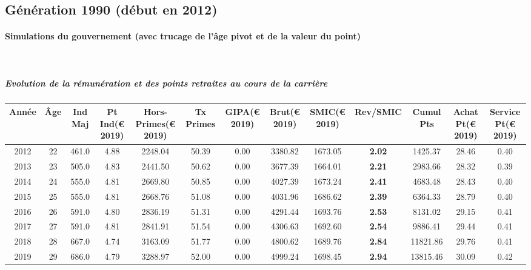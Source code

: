 \newpage 
 
\subsection{Génération 1990 (début en 2012)} 

\paragraph{Simulations du gouvernement (avec trucage de l'âge pivot et de la valeur du point)}  ~\\ 
 
\subparagraph{Evolution de la rémunération et des points retraites au cours de la carrière} 
 
{ \scriptsize \begin{center} 
\begin{tabular}[htb]{|c|c||c|c|c|c|c|c||c|c||c|c|c||} 
\hline 
 Année &  Âge &  Ind Maj &  Pt Ind(\euro{} 2019) &   Hors-Primes(\euro{} 2019) &  Tx Primes &  GIPA(\euro{} 2019) &  Brut(\euro{} 2019) &  SMIC(\euro{} 2019) &  Rev/SMIC &  Cumul Pts &  Achat Pt(\euro{} 2019) &  Service Pt(\euro{} 2019) \\ 
\hline \hline 
 2012 &  22 &  461.0 &  4.88 &  2248.04 &  50.39 &  0.00 &  3380.82 &  1673.05 &  {\bf 2.02} &  1425.37 &  28.46 &  0.40 \\ 
\hline 
 2013 &  23 &  505.0 &  4.83 &  2441.50 &  50.62 &  0.00 &  3677.39 &  1664.01 &  {\bf 2.21} &  2983.66 &  28.32 &  0.39 \\ 
\hline 
 2014 &  24 &  555.0 &  4.81 &  2669.80 &  50.85 &  0.00 &  4027.39 &  1673.24 &  {\bf 2.41} &  4683.48 &  28.43 &  0.40 \\ 
\hline 
 2015 &  25 &  555.0 &  4.81 &  2668.76 &  51.08 &  0.00 &  4031.96 &  1686.62 &  {\bf 2.39} &  6364.33 &  28.79 &  0.40 \\ 
\hline 
 2016 &  26 &  591.0 &  4.80 &  2836.19 &  51.31 &  0.00 &  4291.44 &  1693.76 &  {\bf 2.53} &  8131.02 &  29.15 &  0.41 \\ 
\hline 
 2017 &  27 &  591.0 &  4.81 &  2841.91 &  51.54 &  0.00 &  4306.63 &  1692.60 &  {\bf 2.54} &  9886.41 &  29.44 &  0.41 \\ 
\hline 
 2018 &  28 &  667.0 &  4.74 &  3163.09 &  51.77 &  0.00 &  4800.62 &  1689.76 &  {\bf 2.84} &  11821.86 &  29.76 &  0.41 \\ 
\hline 
 2019 &  29 &  686.0 &  4.79 &  3288.97 &  52.00 &  0.00 &  4999.24 &  1698.45 &  {\bf 2.94} &  13815.46 &  30.09 &  0.42 \\ 

\end{tabular}
\end{center}}
